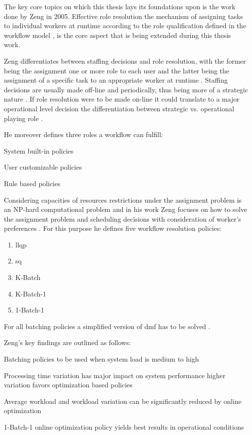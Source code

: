 \documentclass{seal_thesis}
\begin{document}
The key core topics on which this thesis lays its foundations upon is the work done by Zeng in 2005. Effective role resolution \ie the mechanism of assigning tasks to individual workers at runtime according to the role qualification defined in the workflow model \cite{Zeng2005}, is the core aspect that is being extended during this thesis work.

Zeng differentiates between staffing decisions and role resolution, with the former being the assignment one or more role to each user and the latter being the assignment of a specific task to an appropriate worker at runtime \cite{Zeng2005}. Staffing decisions are usually made off-line and periodically, thus being more of a strategic nature \cite{Zeng2005}. If role resolution were to be made on-line it could translate to a major operational level decision \ie the differentiation between strategic vs. operational playing role \cite{Zeng2005}.

He moreover defines three roles a workflow can fulfill:
\begin{enumerate*}
	\item System built-in policies
	\item User customizable policies
	\item Rule based policies
\end{enumerate*}

Considering capacities of resources restrictions under the assignment problem is an NP-hard computational problem and in his work Zeng focuses on how to solve the assignment problem and scheduling decisions with consideration of worker's preferences \cite{Zeng2005}. For this purpose he defines five workflow resolution policies:

\begin{enumerate}
	\item \gls{llqp}
	\item \gls{sq}
	\item K-Batch
	\item K-Batch-1
	\item 1-Batch-1
\end{enumerate}

For all batching policies a simplified version of \gls{dmf} has to be solved \cite{Zeng2005}.

Zeng's key findings are outlined as follows:
\begin{enumerate*}
	\item Batching policies to be used when system load is medium to high
	\item Processing time variation has major impact on system performance \ie higher variation favors optimization based policies
	\item Average workload and workload variation can be significantly reduced by online optimization
	\item 1-Batch-1 online optimization policy yields best results in operational conditions
\end{enumerate*}
\end{document}
